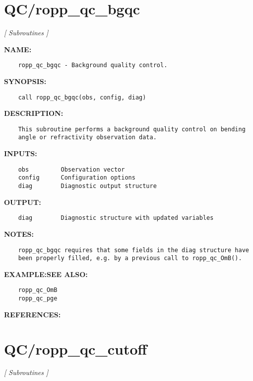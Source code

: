 \section{QC/ropp\_qc\_bgqc}
\textsl{[ Subroutines ]}

\label{ch:robo47}
\label{ch:QC_ropp_qc_bgqc}
\textbf{NAME:}\hspace{0.08in}\begin{Verbatim}
    ropp_qc_bgqc - Background quality control.
\end{Verbatim}
\textbf{SYNOPSIS:}\hspace{0.08in}\begin{Verbatim}
    call ropp_qc_bgqc(obs, config, diag)
\end{Verbatim}
\textbf{DESCRIPTION:}\hspace{0.08in}\begin{Verbatim}
    This subroutine performs a background quality control on bending
    angle or refractivity observation data.
\end{Verbatim}
\textbf{INPUTS:}\hspace{0.08in}\begin{Verbatim}
    obs         Observation vector
    config      Configuration options
    diag        Diagnostic output structure
\end{Verbatim}
\textbf{OUTPUT:}\hspace{0.08in}\begin{Verbatim}
    diag        Diagnostic structure with updated variables
\end{Verbatim}
\textbf{NOTES:}\hspace{0.08in}\begin{Verbatim}
    ropp_qc_bgqc requires that some fields in the diag structure have
    been properly filled, e.g. by a previous call to ropp_qc_OmB().
\end{Verbatim}
\textbf{EXAMPLE:}\hspace{0.08in}\textbf{SEE ALSO:}\hspace{0.08in}\begin{Verbatim}
    ropp_qc_OmB
    ropp_qc_pge
\end{Verbatim}
\textbf{REFERENCES:}\hspace{0.08in}\section{QC/ropp\_qc\_cutoff}
\textsl{[ Subroutines ]}

